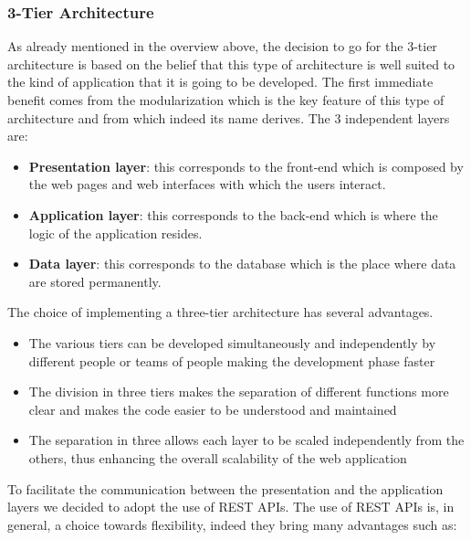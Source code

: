 \subsubsection{3-Tier Architecture}
As already mentioned in the overview above, the decision to go for the 3-tier architecture is based on the belief that this type of architecture is well suited to the kind of application that it is going to be developed.
The first immediate benefit comes from the modularization which is the key feature of this type of architecture and from which indeed its name derives. The 3 independent layers are: 
\begin{itemize}
    \item \textbf{Presentation layer}: this corresponds to the front-end which is composed by the web pages and web interfaces with which the users interact.
    \item \textbf{Application layer}: this corresponds to the back-end which is where the logic of the application resides. 
    \item \textbf{Data layer}: this corresponds to the database which is the place where data are stored permanently.
\end{itemize}
The choice of implementing a three-tier architecture has several advantages.
\begin{itemize}
    \item The various tiers can be developed simultaneously and independently by different people or teams of people making the development phase faster
    \item The division in three tiers makes the separation of different functions more clear and makes the code easier to be understood and maintained
    \item The separation in three allows each layer to be scaled independently from the others, thus enhancing the overall scalability of the web application
\end{itemize}
To facilitate the communication between the presentation  and the application layers we decided to adopt the use of REST APIs. The use of REST APIs is, in general, a choice towards flexibility, indeed they bring many advantages such as:

